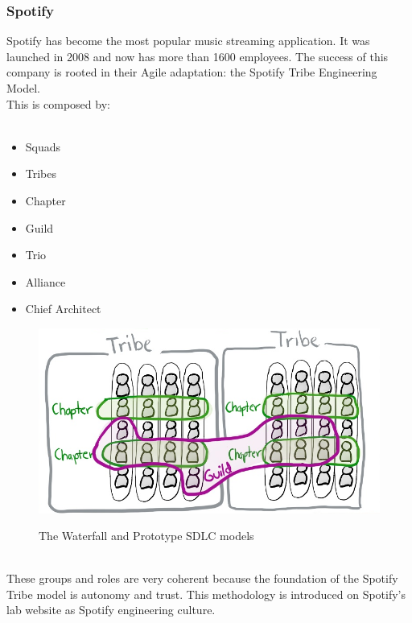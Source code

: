 	\subsubsection{Spotify}
		Spotify has become the most popular music streaming application.
		It was launched in 2008 and now has more than 1600 employees.
		The success of this company is rooted in their Agile adaptation: the Spotify Tribe Engineering Model.\\
		This is composed by:\\\\
		\begin{minipage}[c]{0.25\textwidth}
			\begin{itemize}
				\item Squads
				\item Tribes
				\item Chapter
				\item Guild
				\item Trio
				\item Alliance
				\item Chief Architect
			\end{itemize}
		\end{minipage}
		\hfill
		\begin{minipage}[c]{0.70\textwidth}
			\vspace{-2cm}
			\begin{figure}[H]
				\centering
				\includegraphics[width=\textwidth]{resources/spot}\\
				\caption{The Waterfall and Prototype SDLC models}
			\end{figure}

		\end{minipage}\\
		These groups and roles are very coherent because the foundation of the Spotify Tribe model is autonomy and trust\cite{exploring-key-elements-of-spotifys}.
		This methodology is introduced on Spotify's lab website as Spotify engineering culture\cite{spotify-engineering-culture}.
		
